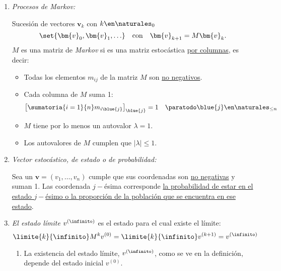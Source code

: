 \begin{enumerate}[label=\tiny\purple{\faIcon{snowman}}]
\item\hypertarget{teoria-4:markov}{\textit{Procesos de Markov:}}

Sucesión de vectores $\bm{v}_k$ con $k \en \naturales_0$
$$
  \set{\bm{v}_0, \bm{v}_1, \ldots}
  \quad
  \text{con}
  \quad
  \bm{v}_{k+1} = M \bm{v}_k.
$$
$M$ es una matriz de \textit{Markov} si es una matriz estocástica \underline{por columnas}, es decir:
\begin{itemize}
  \item Todas los elementos $m_{ij}$ de la matriz $M$ son \underline{no negativos}.

  \item Cada columna de $M$ suma 1:
        $$
          \left[\sumatoria{i = 1}{n} m_{i\blue{j}}\right]_{\blue{j}} = 1
          \quad
          \paratodo \blue{j} \en \naturales_{\leq n}
        $$

  \item $M$ tiene por lo menos un autovalor $\lambda = 1$.

  \item Los autovalores de $M$ cumplen que $|\lambda| \leq 1$.
\end{itemize}

\item \textit{Vector estocástico, de estado o de probabilidad:}

Sea un $\bm{v} = (v_1, \ldots, v_n)$ cumple que sus coordenadas son \underline{no negativas} y suman 1.
Las coordenada $j-$ésima corresponde \ul{la probabilidad de estar en el estado $j-$ésimo o la proporción
  de la población que se encuentra en ese estado}.

\item
\textit{El estado límite $v^{(\infinito)}$} es el estado para el cual existe el límite:
$$
  \limite{k}{\infinito} M^kv^{(0)} =
  \limite{k}{\infinito} v^{(k+1)} =  v^{(\infinito)}
$$
\begin{enumerate}[label=\red{\tiny\faIcon{pray}$_{\arabic*}$}]
  \item La existencia del estado límite, $v^{(\infinito)}$, como se ve en la definición, depende del estado inicial $v^{(0)}$.


\end{enumerate}
\end{enumerate}

